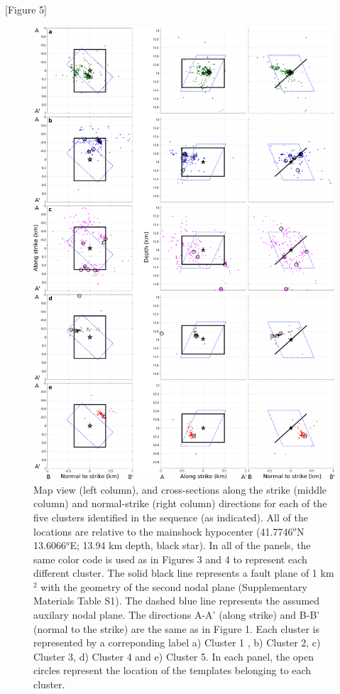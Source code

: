 \documentclass[a4paper,12pt,twoside]{article}
\begin{document}
\begin{center}
   [Figure 5]
\end{center}

\begin{figure}
    \centering
     \includegraphics[width=0.8\linewidth]{map_clusters_templates.pdf}     
\caption{Map view (left column), and cross-sections along the strike (middle column) and normal-strike (right column) directions for each of the five clusters identified in the sequence (as indicated). All of the locations are relative to the mainshock hypocenter (41.7746$^o$N 13.6066$^o$E; 13.94 km depth, black star). In all of the panels, the same color code is used as in Figures 3 and 4 to represent each different cluster. The solid black line represents a fault plane of 1 km$^2$ with the geometry of the second nodal plane (Supplementary Materials Table S1). The dashed blue line represents the assumed auxilary nodal plane. The directions A-A' (along strike) and B-B' (normal to the strike) are the same as in Figure 1. Each cluster is represented by a correponding label a) Cluster 1 , b) Cluster 2, c) Cluster 3, d) Cluster 4 and e) Cluster 5. In each panel, the open circles represent the location of the templates belonging to each cluster.}
\end{figure}          \label{fig:maps_each_cluster}
\end{document}
